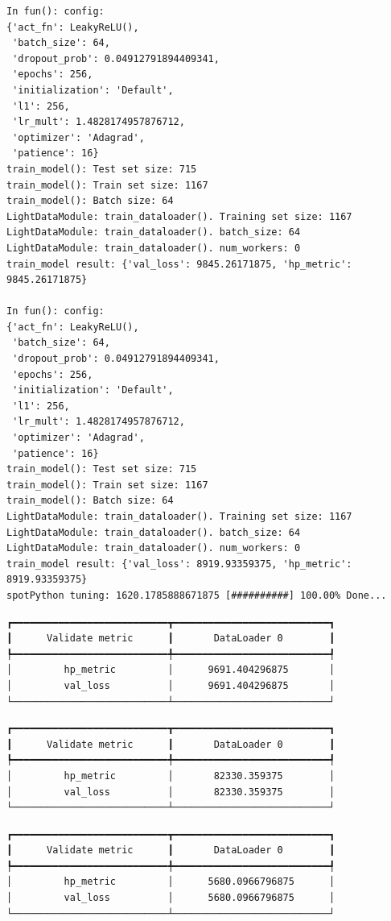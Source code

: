 \documentclass[
  letterpaper,
  DIV=11,
  numbers=noendperiod]{scrreprt}
\begin{document}
\begin{verbatim}
In fun(): config:
{'act_fn': LeakyReLU(),
 'batch_size': 64,
 'dropout_prob': 0.04912791894409341,
 'epochs': 256,
 'initialization': 'Default',
 'l1': 256,
 'lr_mult': 1.4828174957876712,
 'optimizer': 'Adagrad',
 'patience': 16}
train_model(): Test set size: 715
train_model(): Train set size: 1167
train_model(): Batch size: 64
LightDataModule: train_dataloader(). Training set size: 1167
LightDataModule: train_dataloader(). batch_size: 64
LightDataModule: train_dataloader(). num_workers: 0
train_model result: {'val_loss': 9845.26171875, 'hp_metric': 9845.26171875}

In fun(): config:
{'act_fn': LeakyReLU(),
 'batch_size': 64,
 'dropout_prob': 0.04912791894409341,
 'epochs': 256,
 'initialization': 'Default',
 'l1': 256,
 'lr_mult': 1.4828174957876712,
 'optimizer': 'Adagrad',
 'patience': 16}
train_model(): Test set size: 715
train_model(): Train set size: 1167
train_model(): Batch size: 64
LightDataModule: train_dataloader(). Training set size: 1167
LightDataModule: train_dataloader(). batch_size: 64
LightDataModule: train_dataloader(). num_workers: 0
train_model result: {'val_loss': 8919.93359375, 'hp_metric': 8919.93359375}
spotPython tuning: 1620.1785888671875 [##########] 100.00% Done...
\end{verbatim}

\begin{verbatim}
┏━━━━━━━━━━━━━━━━━━━━━━━━━━━┳━━━━━━━━━━━━━━━━━━━━━━━━━━━┓
┃      Validate metric      ┃       DataLoader 0        ┃
┡━━━━━━━━━━━━━━━━━━━━━━━━━━━╇━━━━━━━━━━━━━━━━━━━━━━━━━━━┩
│         hp_metric         │      9691.404296875       │
│         val_loss          │      9691.404296875       │
└───────────────────────────┴───────────────────────────┘
\end{verbatim}

\begin{verbatim}
┏━━━━━━━━━━━━━━━━━━━━━━━━━━━┳━━━━━━━━━━━━━━━━━━━━━━━━━━━┓
┃      Validate metric      ┃       DataLoader 0        ┃
┡━━━━━━━━━━━━━━━━━━━━━━━━━━━╇━━━━━━━━━━━━━━━━━━━━━━━━━━━┩
│         hp_metric         │       82330.359375        │
│         val_loss          │       82330.359375        │
└───────────────────────────┴───────────────────────────┘
\end{verbatim}

\begin{verbatim}
┏━━━━━━━━━━━━━━━━━━━━━━━━━━━┳━━━━━━━━━━━━━━━━━━━━━━━━━━━┓
┃      Validate metric      ┃       DataLoader 0        ┃
┡━━━━━━━━━━━━━━━━━━━━━━━━━━━╇━━━━━━━━━━━━━━━━━━━━━━━━━━━┩
│         hp_metric         │      5680.0966796875      │
│         val_loss          │      5680.0966796875      │
└───────────────────────────┴───────────────────────────┘
\end{verbatim}
\end{document}
